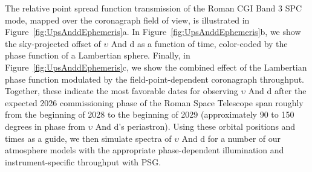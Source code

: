 \documentclass[12pt, letterpaper]{aastex631}
\begin{document}
The relative point spread function transmission of the Roman CGI Band 3 SPC mode, mapped over the coronagraph field of view, is illustrated in Figure~\ref{fig:UpsAnddEphemeris}a. In Figure~\ref{fig:UpsAnddEphemeris}b, we show the sky-projected offset of $\upsilon$ And d as a function of time, color-coded by the phase function of a Lambertian sphere. Finally, in Figure~\ref{fig:UpsAnddEphemeris}c, we show the combined effect of the Lambertian phase function modulated by the field-point-dependent coronagraph throughput. Together, these indicate the most favorable dates for observing $\upsilon$ And d after the expected 2026 commissioning phase of the Roman Space Telescope span roughly from the beginning of 2028 to the beginning of 2029 (approximately 90 to 150 degrees in phase from $\upsilon$ And d's periastron). Using these orbital positions and times as a guide, we then simulate spectra of $\upsilon$ And d for a number of our atmosphere models with the appropriate phase-dependent illumination and instrument-specific throughput with PSG.
\end{document}
